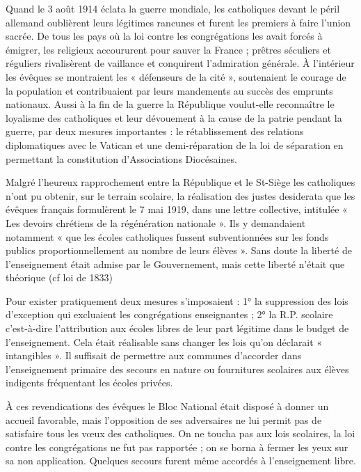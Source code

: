 Quand le 3 août 1914 éclata la guerre mondiale, les catholiques devant le péril allemand oublièrent leurs légitimes rancunes et furent les premiers à faire l'union sacrée. De tous les pays où la loi contre les congrégations les avait forcés à émigrer, les religieux accoururent pour sauver la France ; prêtres séculiers et réguliers rivalisèrent de vaillance et conquirent l'admiration générale. À l'intérieur les évêques se montraient les « défenseurs de la cité », soutenaient le courage de la population et contribuaient par leurs mandements au succès des emprunts nationaux. Aussi à la fin de la guerre la République voulut-elle reconnaître le loyalisme des catholiques et leur dévouement à la cause de la patrie pendant la guerre, par deux mesures importantes : le rétablissement des relations diplomatiques avec le Vatican et une demi-réparation de la loi de séparation en permettant la constitution d'Associations Diocésaines.

Malgré l'heureux rapprochement entre la République et le St-Siège les catholiques n'ont pu obtenir, sur le terrain scolaire, la réalisation des justes desiderata que les évêques français formulèrent le 7 mai 1919, dans une lettre collective, intitulée « Les devoirs chrétiens de la régénération nationale ». Ils y demandaient notamment « que les écoles catholiques fussent subventionnées sur les fonds publics proportionnellement au nombre de leurs élèves ». Sans doute la liberté
de l'enseignement était admise par le Gouvernement, mais cette liberté n'était que théorique (cf loi de 1833)

Pour exister pratiquement deux mesures s'imposaient : 1° la suppression des lois d'exception qui excluaient les congrégations enseignantes ; 2° la R.P. scolaire c'est-à-dire l'attribution aux écoles libres de leur part légitime dans le budget de l'enseignement. Cela était réalisable sans changer les lois qu'on déclarait « intangibles ». Il suffisait de permettre aux communes d'accorder dans l'enseignement primaire des secours en nature ou fournitures scolaires aux élèves indigents fréquentant les écoles privées.

À ces revendications des évêques le Bloc National était disposé à donner un accueil favorable, mais l'opposition de ses adversaires ne lui permit pas de satisfaire tous les vœux des catholiques. On ne toucha pas aux lois scolaires, la loi contre les congrégations ne fut pas rapportée ; on se borna à fermer les yeux sur sa non application. Quelques secours furent même accordés à l'enseignement libre.

